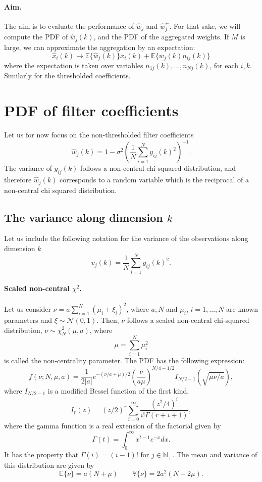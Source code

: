 \documentclass[a4paper,10pt]{article}
\begin{document}
\paragraph{Aim.}The aim is to evaluate the performance of $\hat w_j$ and $\hat
w_j^+$. For that sake, we will compute the PDF of $\hat w_j(k)$, and the PDF of the
aggregated weights. If $M$ is large, we can approximate the aggregation by an 
expectation:
\[\hat x_i(k)\to \mathbb E\{ \hat w_j(k) \} x_i(k) + \mathbb E\{w_j(k) n_{ij}(k)\}\]
where the expectation is taken over variables $n_{1j}(k), \dots, n_{Nj}(k)$,
for each $i, k$. Similarly for the thresholded coefficients.

\section{PDF of filter coefficients}

Let us for now focus on the non-thresholded filter coefficients 
\[\hat w_j(k) =  
1 - \sigma^2\left(\frac1N\sum_{i = 1}^N y_{ij}(k)^2\right)^{-1}.\]
The variance of $y_{ij}(k)$ follows a non-central chi squared distribution,
and therefore $\hat w_j(k)$ corresponds to a random variable which is the
reciprocal of a non-central chi squared distribution. 

\subsection{The variance along dimension $k$}

Let us include the following notation for the variance of the observations
along dimension $k$
\[v_j(k) = \frac1N\sum_{i = 1}^Ny_{ij}(k)^2.\]

\paragraph{Scaled non-central $\chi^2$.}Let us consider
$\nu = a\sum_{i = 1}^N (\mu_i + \xi_i)^2$, where $a, N$ and $\mu_i$, $i =
1,\dots,N$ are known parameters and $\xi\sim\mathcal N(0,1)$. 
Then, $\nu$ follows a scaled non-central chi-squared distribution,
$\nu\sim\chi^2_N(\mu,a)$, where
\[\mu = \sum_{i = 1}^N \mu_i^2\]
is called the non-centrality parameter.
The PDF has the following expression:
\[f(\nu; N, \mu, a) = \frac1{2|a|} e^{-(\nu/a+\mu)/2}\left(\frac{\nu}{a\mu}\right)^{N/4 - 1/2} I_{N/2-1}(\sqrt{\mu\nu/a}),\]
where $I_{N/2-1}$ is a modified Bessel function of the first kind,
\[I_r(z) = (z/2)^r\sum_{i = 0}^\infty\frac{(z^2/4)^i}{i!\Gamma(r + i + 1)},\]
where the gamma function is a real extension of the factorial 
given by 
\[\Gamma(t) = \int_0^\infty x^{t-1}e^{-x}dx.\]
It has the property that $\Gamma(i) = (i-1)!$ for $j\in\mathbb N_+$.
The mean and variance of this distribution are given by
\[\mathbb E\{\nu\} = a(N + \mu)\quad\quad\mathbb V\{\nu\} = 2a^2(N + 2\mu).\]
\end{document}
